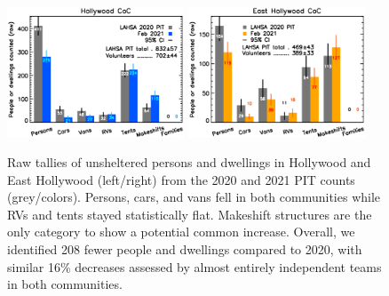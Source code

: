 \documentclass[11pt]{article}
\begin{document}
\begin{figure}[h]
	\centering
	\includegraphics[width = 0.47\textwidth, trim = 1cm 0cm 0cm 0cm]{Hwood2021Bars}
	\includegraphics[width = 0.47\textwidth, trim = 1cm 0cm 0cm 0cm]{Eho2021Bars}
	\caption{Raw tallies of unsheltered persons and dwellings in Hollywood and East Hollywood
			(left/right) from the 2020 and 2021 PIT counts (grey/colors). Persons, cars, 
			and vans fell in both communities while RVs and tents stayed statistically flat. 
			Makeshift structures are the only category to show a potential common increase. 
			Overall, we identified 208 fewer people and dwellings compared to 2020,
			with similar 16\% decreases assessed by almost entirely independent teams
			in both communities.}
	\label{fig:rawCounts}
\end{figure}
\end{document}

